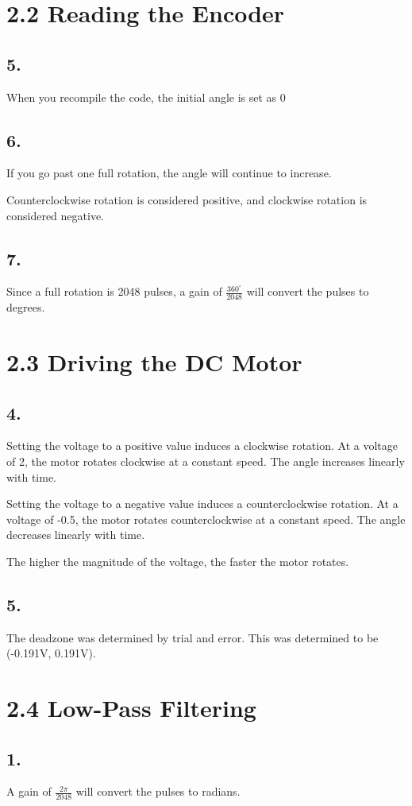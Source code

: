 \documentclass[letterpaper,12pt]{article}
\begin{document}
\section*{2.2 Reading the Encoder}
\subsection*{5.}
When you recompile the code, the initial angle is set as 0
\subsection*{6.}
If you go past one full rotation, the angle will continue to increase. 

Counterclockwise rotation is considered positive, and clockwise rotation is considered negative.
\subsection*{7.}
Since a full rotation is 2048 pulses, a gain of $\frac{360^\circ}{2048}$ will convert the pulses to degrees.
\section*{2.3 Driving the DC Motor}
\subsection*{4.}
Setting the voltage to a positive value induces a clockwise rotation. At a voltage of 2,
the motor rotates clockwise at a constant speed. The angle increases linearly with time.

Setting the voltage to a negative value induces a counterclockwise rotation. At a voltage of -0.5,
the motor rotates counterclockwise at a constant speed. The angle decreases linearly with time.

The higher the magnitude of the voltage, the faster the motor rotates.

\subsection*{5.}
The deadzone was determined by trial and error. This was determined to be 
(-0.191V, 0.191V).

\section*{2.4 Low-Pass Filtering}
\subsection*{1.}
A gain of $\frac{2\pi}{2048}$ will convert the pulses to radians.
\end{document}
